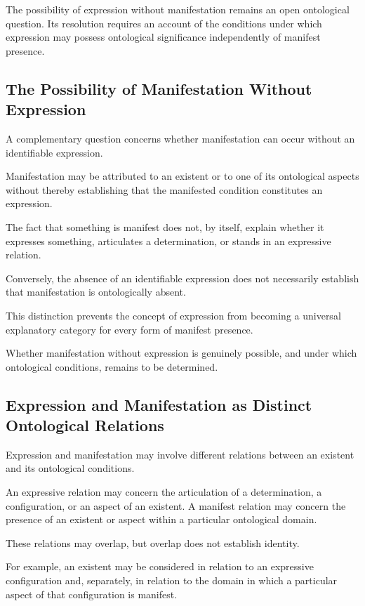 The possibility of expression without manifestation remains
an open ontological question. Its resolution requires an
account of the conditions under which expression may possess
ontological significance independently of manifest presence.

\subsection{The Possibility of Manifestation Without Expression}

A complementary question concerns whether manifestation
can occur without an identifiable expression.

Manifestation may be attributed to an existent or to one
of its ontological aspects without thereby establishing that
the manifested condition constitutes an expression.

The fact that something is manifest does not, by itself,
explain whether it expresses something, articulates a
determination, or stands in an expressive relation.

Conversely, the absence of an identifiable expression
does not necessarily establish that manifestation is
ontologically absent.

This distinction prevents the concept of expression from
becoming a universal explanatory category for every form
of manifest presence.

Whether manifestation without expression is genuinely
possible, and under which ontological conditions, remains
to be determined.

\subsection{Expression and Manifestation as Distinct Ontological Relations}

Expression and manifestation may involve different relations
between an existent and its ontological conditions.

An expressive relation may concern the articulation
of a determination, a configuration, or an aspect of an
existent. A manifest relation may concern the presence
of an existent or aspect within a particular ontological
domain.

These relations may overlap, but overlap does not establish
identity.

For example, an existent may be considered in relation
to an expressive configuration and, separately, in relation
to the domain in which a particular aspect of that
configuration is manifest.

